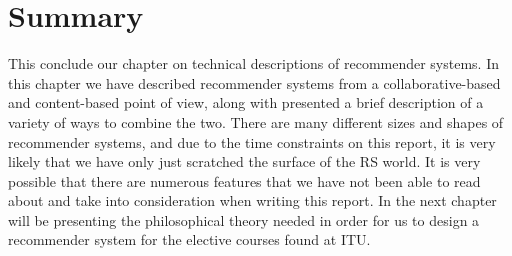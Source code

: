\section{Summary}

This conclude our chapter on technical descriptions of recommender systems. In this chapter we have described recommender systems from a collaborative-based and content-based point of view, along with presented a brief description of a variety of ways to combine the two. There are many different sizes and shapes of recommender systems, and due to the time constraints on this report, it is very likely that we have only just scratched the surface of the RS world. It is very possible that there are numerous features that we have not been able to read about and take into consideration when writing this report.
In the next chapter will be presenting the philosophical theory needed in order for us to design a recommender system for the elective courses found at ITU.

